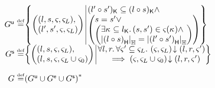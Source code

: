 \begin{definition}[Guarantee]
\[\begin{array}{@{} r @{} l @{}}
	\updateG \eqdef &
 	\left\{
	\begin{array}{@{} l @{\hspace*{2pt}} | @{\hspace*{2pt}} r @{}}
	   	\left(
	   	\begin{array}{@{} l @{}}
	     	(l, s, \amod{}, \amod{L}),\\
	     	(l', s', \amod{}, \amod{L})
	   	\end{array}
		\right)
	  	&
	  	\begin{array}{@{} l @{} }
	  		\capPart{(l' \composeL s')}  \subseteq \capPart{(l \composeL s)} \land\\
		  	\left(
		  	\begin{array}{@{} l @{} }
		 		s = s' \lor\\
		 	  	\left(
		 	  	\begin{array}{@{} l @{}}
		 	  		\exsts{\ca{} \subseteq \capPart{l}}
		 	  		(s, s') \in \amod{}(\ca{}) \land\\
		 	  	
		 	  	\heapSize{\heapPart{\left(l \composeL s\right)}} = 
		 	  	\heapSize{\heapPart{\left(l' \composeL s'\right)}}
		 	  	\end{array}	
		 	  	\right)
		 	\end{array}
	   		\right)
   		\end{array}
 	\end{array}
	\right\}\\
	
	
	
	\shiftG \eqdef & 
	\left\{
	\begin{array}{@{} l @{\hspace*{2pt}} | @{\hspace*{2pt}} r @{}}
	   \left(
	   \begin{array}{@{} l @{}}
	     (l, s, \amod{}, \amod{L}),\\
 	     \left( l, s, \amod{}, \amod{L} \cup \amod{0}  \right)
	   \end{array}
 	  \right)
	   &
 	  	\begin{array}{@{} l @{}}
	 	  	\for{l, r} \for{\amod{}' \subseteq \amod{L}} \extendsAM{\amod{}, \amod{L}}{l}{r}{\amod{}'} \\
	 	  	\hspace*{0.5cm} \implies \extendsAM{\amod{}, \amod{L} \cup \amod{0}}{l}{r}{\amod{}'}
   		\end{array}
 	\end{array}
	\right\}\\\\
	
	\guarantee \eqdef & \left( \updateG \cup \extendG \cup \shiftG \right)^{*} \\\\
\end{array}
\]
%
\end{definition}
%
%

